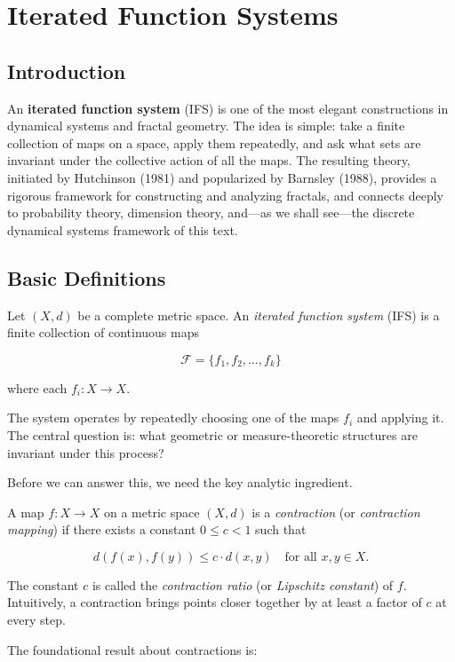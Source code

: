\chapter{Iterated Function Systems}

\section{Introduction}

An \textbf{iterated function system} (IFS) is one of the most elegant constructions in dynamical systems and fractal geometry. The idea is simple: take a finite collection of maps on a space, apply them repeatedly, and ask what sets are invariant under the collective action of all the maps. The resulting theory, initiated by Hutchinson (1981) and popularized by Barnsley (1988), provides a rigorous framework for constructing and analyzing fractals, and connects deeply to probability theory, dimension theory, and—as we shall see—the discrete dynamical systems framework of this text.

\section{Basic Definitions}

\begin{definition}
Let $(X, d)$ be a complete metric space. An \textit{iterated function system} (IFS) is a finite collection of continuous maps

\[\mathcal{F} = \{ f_1, f_2, \ldots, f_k\} \]

where each $f_i : X \to X$.

The system operates by repeatedly choosing one of the maps $f_i$ and applying it. The central question is: what geometric or measure-theoretic structures are invariant under this process?

Before we can answer this, we need the key analytic ingredient.
\end{definition}

\begin{definition}
A map $f : X \to X$ on a metric space $(X, d)$ is a \textit{contraction} (or \textit{contraction mapping}) if there exists a constant $0 \le c < 1$ such that

\[d(f(x), f(y)) \le c \cdot d(x, y) \quad \text{for all } x, y \in X.\]

The constant $c$ is called the \textit{contraction ratio} (or \textit{Lipschitz constant}) of $f$. Intuitively, a contraction brings points closer together by at least a factor of $c$ at every step.

The foundational result about contractions is:
\end{definition}

